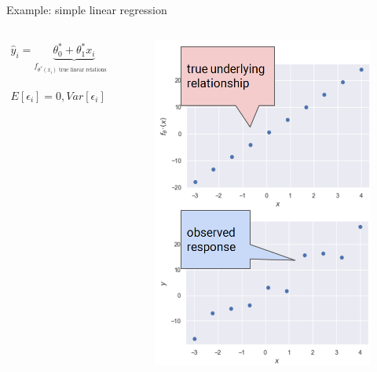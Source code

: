\documentclass[aspectratio=169]{../latex_main/tntbeamer}  %
\begin{document}
    \begin{frame}{Example: simple linear regression}
        \begin{columns}
            \begin{column}{.5\textwidth}
                    \begin{align*}
                        \hat{y}_i = \underbrace{\theta^*_0 + \theta^*_1x_i}_{f_{\theta^*(x_i) \text{ true linear relationship}}} +\underbrace{\epsilon_i}_{\text{random noise}}
                    \end{align*}
                    
                    
                    \bigskip
                    \begin{align*}
                        E[\epsilon_i] = 0, Var[\epsilon_i] = \sigma^2
                    \end{align*}
            \end{column}
            
            
            \begin{column}{.5\textwidth}
                  \begin{figure}
                      \centering
                      \includegraphics[scale=.28]{Bild10}
                  \end{figure}  
            \end{column}
        \end{columns}
    \end{frame}
\end{document}
